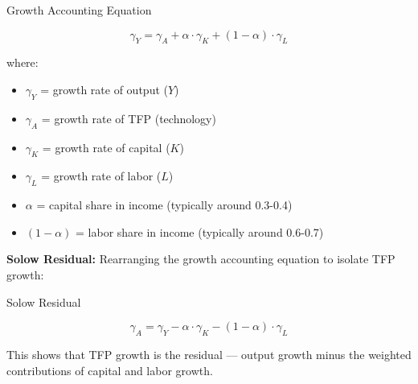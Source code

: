 \vspace{0.3cm}

\begin{resultbox}{Growth Accounting Equation}
    
    \begin{equation}
        \boxed{\gamma_Y = \gamma_A + \alpha \cdot \gamma_K + (1-\alpha) \cdot \gamma_L}
    \end{equation}
    
    where:
    \begin{itemize}
        \item $\gamma_Y$ = growth rate of output ($Y$)
        \item $\gamma_A$ = growth rate of TFP (technology)
        \item $\gamma_K$ = growth rate of capital ($K$)
        \item $\gamma_L$ = growth rate of labor ($L$)
        \item $\alpha$ = capital share in income (typically around 0.3-0.4)
        \item $(1-\alpha)$ = labor share in income (typically around 0.6-0.7)
    \end{itemize}
    
\end{resultbox}

\vspace{0.5cm}

\textbf{Solow Residual:} Rearranging the growth accounting equation to isolate TFP growth:

\begin{resultbox}{Solow Residual}
    
    \begin{equation}
        \boxed{\gamma_A = \gamma_Y - \alpha \cdot \gamma_K - (1-\alpha) \cdot \gamma_L}
    \end{equation}
    
    This shows that TFP growth is the residual --- output growth minus the weighted contributions of capital and labor growth.

\end{resultbox}

\clearpage
